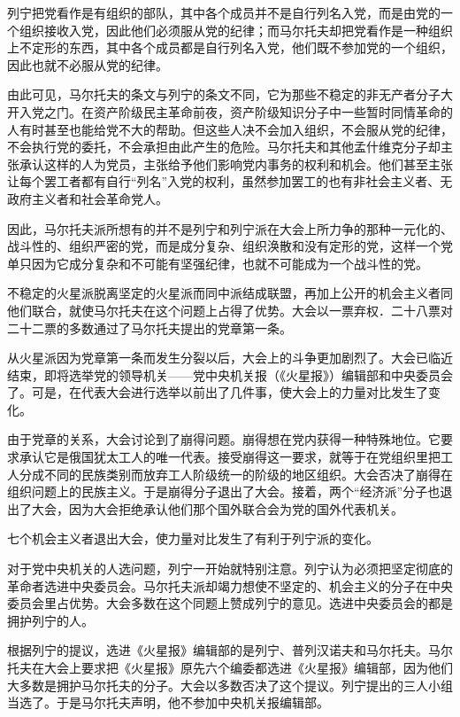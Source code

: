 列宁把党看作是有组织的部队，其中各个成员并不是自行列名入党，而是由党的一个组织接收入党，因此他们必须服从党的纪律；而马尔托夫却把党看作是一种组织上不定形的东西，其中各个成员都是自行列名入党，他们既不参加党的一个组织，因此也就不必服从党的纪律。

由此可见，马尔托夫的条文与列宁的条文不同，它为那些不稳定的非无产者分子大开入党之门。在资产阶级民主革命前夜，资产阶级知识分子中一些暂时同情革命的人有时甚至也能给党不大的帮助。但这些人决不会加入组织，不会服从党的纪律，不会执行党的委托，不会承担由此产生的危险。马尔托夫和其他孟什维克分子却主张承认这样的人为党员，主张给予他们影响党内事务的权利和机会。他们甚至主张让每个罢工者都有自行“列名”入党的权利，虽然参加罢工的也有非社会主义者、无政府主义者和社会革命党人。

因此，马尔托夫派所想有的并不是列宁和列宁派在大会上所力争的那种一元化的、战斗性的、组织严密的党，而是成分复杂、组织涣散和没有定形的党，这样一个党单只因为它成分复杂和不可能有坚强纪律，也就不可能成为一个战斗性的党。

不稳定的火星派脱离坚定的火星派而同中派结成联盟，再加上公开的机会主义者同他们联合，就使马尔托夫在这个问题上占得了优势。大会以一票弃权．二十八票对二十二票的多数通过了马尔托夫提出的党章第一条。

从火星派因为党章第一条而发生分裂以后，大会上的斗争更加剧烈了。大会已临近结束，即将选举党的领导机关——党中央机关报（《火星报》）编辑部和中央委员会了。可是，在代表大会进行选举以前出了几件事，使大会上的力量对比发生了变化。

由于党章的关系，大会讨论到了崩得问题。崩得想在党内获得一种特殊地位。它要求承认它是俄国犹太工人的唯一代表。接受崩得这一要求，就等于在党组织里把工人分成不同的民族类别而放弃工人阶级统一的阶级的地区组织。大会否决了崩得在组织问题上的民族主义。于是崩得分子退出了大会。接着，两个“经济派”分子也退出了大会，因为大会拒绝承认他们那个国外联合会为党的国外代表机关。

七个机会主义者退出大会，使力量对比发生了有利于列宁派的变化。

对于党中央机关的人选问题，列宁一开始就特别注意。列宁认为必须把坚定彻底的革命者选进中央委员会。马尔托夫派却竭力想使不坚定的、机会主义的分子在中央委员会里占优势。大会多数在这个同题上赞成列宁的意见。选进中央委员会的都是拥护列宁的人。

根据列宁的提议，选进《火星报》编辑部的是列宁、普列汉诺夫和马尔托夫。马尔托夫在大会上要求把《火星报》原先六个编委都选进《火星报》编辑部，因为他们大多数是拥护马尔托夫的分子。大会以多数否决了这个提议。列宁提出的三人小组当选了。于是马尔托夫声明，他不参加中央机关报编辑部。

